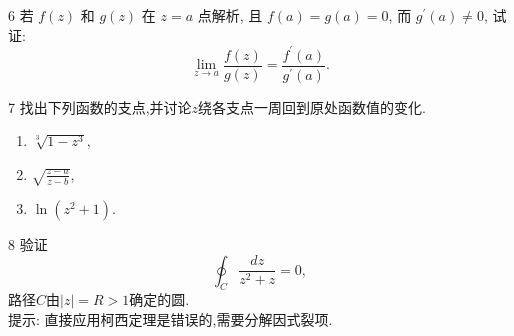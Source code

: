 \documentclass[11pt]{article}
\begin{document}
\begin{hwproblem}{6}
  若 $f(z)$ 和 $g(z)$ 在 $z=a$ 点解析, 且 $f(a)=g(a)=0$, 而 $g^{\prime}(a) \neq 0$, 试证:
  $$
\lim _{z \rightarrow a} \frac{f(z)}{g(z)}=\frac{f^{\prime}(a)}{g^{\prime}(a)}.
$$
\end{hwproblem}

\vspace{0.5cm}

\begin{hwproblem}{7}
  找出下列函数的支点,并讨论$z$绕各支点一周回到原处函数值的变化.
  \begin{enumerate}
    \item $\sqrt[3]{1-z^3}$,
    \item $\sqrt{\frac{z-a}{z-b}}$,
    \item $\ln{(z^2 + 1)}$.
  \end{enumerate}
\end{hwproblem}

\vspace{0.5cm}

\begin{hwproblem}{8}
  验证
  $$\oint_C \frac{d z}{z^2+z}=0,
  $$
  路径$C$由$|z|=R>1$确定的圆.\\

  提示: 直接应用柯西定理是错误的,需要分解因式裂项.
\end{hwproblem}

\vspace{0.5cm}


\vspace{0.5cm}



\vspace{0.5cm}

\end{document}
